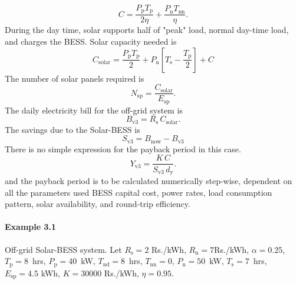 \begin{equation}
    C = \frac{P_\text{p} T_\text{p} }{2 \eta} + \frac{P_\text{n} T_\text{nn} }{\eta}.
\end{equation}
During the day time, solar supports half of "peak" load, normal day-time load,
and charges the BESS.  Solar capacity needed is
\begin{equation}
    \label{eq:cs}
   C_\text{solar} = 
        \frac{P_\text{p} T_\text{p} }{2} + P_\text{n}  \left[T_\text{s} - \frac{T_\text{p}}{2} \right] + C
\end{equation}
The number of solar panels required is
\begin{equation}
    N_\text{sp} = \frac{C_\text{solar}}{E_\text{sp}}.
\end{equation}
The daily electricity bill for the off-grid system is
\begin{equation}
    B_\text{v3} = R_\text{s} \, C_\text{solar}.
\end{equation}
The savings due to the Solar-BESS is
\begin{equation}
    S_\text{v3} = B_\text{now} - B_\text{v3} 
\end{equation}
There is no simple expression for the payback period in this case.
\begin{equation}
    Y_\text{v3} = \frac{K \, C}{S_\text{v3} \, d_\text{y}}.
\end{equation}
and the payback period is to be calculated numerically step-wise, dependent
on all the parameters used BESS capital cost, power rates, load 
consumption pattern, solar availability, and round-trip efficiency.

\paragraph{Example 3.1} Off-grid Solar-BESS system.
Let $R_{\text{s}} = 2$ Rs./kWh, $R_\text{n} = 7$Rs./kWh, $\alpha=0.25$,
$T_\text{p}=8$~hrs, $P_\text{p} = 40$~kW, $T_\text{nd}=8$~hrs, $T_\text{nn}=0$,
$P_\text{n} = 50$~kW, $T_{\text{s}} = 7$~hrs, $E_{\text{sp}} = 4.5$ kWh, $K =
30000$ Rs./kWh, $\eta = 0.95$. 

